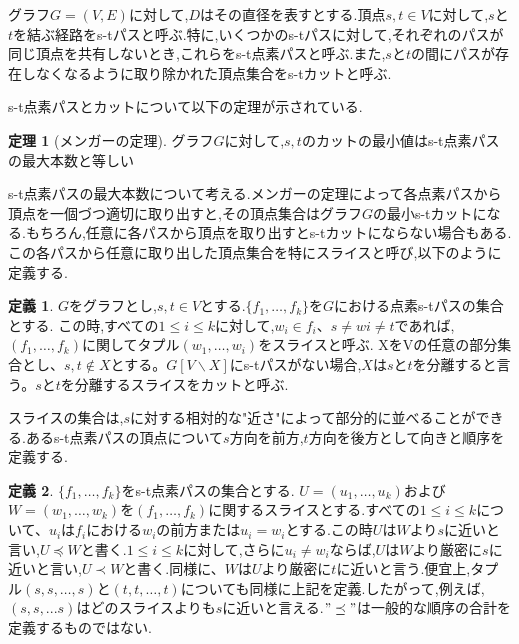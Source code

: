 \documentclass{thesis}
\theoremstyle{definition}
\newtheorem{theorem}{定理}
\newtheorem{definition}{定義}
\begin{document}
グラフ$G=(V,E)$に対して,$D$はその直径を表すとする.頂点$s,t\in V$に対して,$s$と$t$を結ぶ経路をs-tパスと呼ぶ.特に,いくつかのs-tパスに対して,それぞれのパスが同じ頂点を共有しないとき,これらをs-t点素パスと呼ぶ.また,$s$と$t$の間にパスが存在しなくなるように取り除かれた頂点集合をs-tカットと呼ぶ.\par

s-t点素パスとカットについて以下の定理が示されている.

\begin{theorem}[メンガーの定理]
    グラフ$G$に対して,$s,t$のカットの最小値はs-t点素パスの最大本数と等しい
\end{theorem}

s-t点素パスの最大本数について考える.メンガーの定理によって各点素パスから頂点を一個づつ適切に取り出すと,その頂点集合はグラフ$G$の最小s-tカットになる.もちろん,任意に各パスから頂点を取り出すとs-tカットにならない場合もある.この各パスから任意に取り出した頂点集合を特にスライスと呼び,以下のように定義する.

\begin{definition}
    $G$をグラフとし,$s,t\in V$とする.$\{f_1, \dots ,f_k\}$を$G$における点素s-tパスの集合とする.
    この時,すべての$1\leq i\leq k$に対して,$w_i \in f_i$、$s \neq wi \neq t$であれば,$(f_1, \dots ,f_k)$に関してタプル$(w_1, \dots ,w_i)$をスライスと呼ぶ.
    XをVの任意の部分集合とし、$s,t \notin X$とする。$G[V\backslash X]$にs-tパスがない場合,$X$は$s$と$t$を分離すると言う。$s$と$t$を分離するスライスをカットと呼ぶ.
\end{definition}

スライスの集合は,$s$に対する相対的な"近さ"によって部分的に並べることができる.あるs-t点素パスの頂点について$s$方向を前方,$t$方向を後方として向きと順序を定義する.

\begin{definition}
    $\{f_1, \dots ,f_k\}$をs-t点素パスの集合とする.
    $U=(u_1, \dots, u_k)$および$W=(w_1, \dots ,w_k)$を$(f_1, \dots ,f_k)$に関するスライスとする.すべての$1\leq i\leq k$について、$u_i$は$f_i$における$w_i$の前方または$u_i=w_i$とする.この時$U$は$W$より$s$に近いと言い,$U\preceq W$と書く.$1 \leq i \leq k$に対して,さらに$u_i \neq w_i$ならば,$U$は$W$より厳密に$s$に近いと言い,$U \prec W$と書く.同様に、$W$は$U$より厳密に$t$に近いと言う.便宜上,タプル$(s,s, \dots ,s)$と$(t,t, \dots ,t)$についても同様に上記を定義.したがって,例えば,$(s,s,...s)$はどのスライスよりも$s$に近いと言える.$"\preceq"$は一般的な順序の合計を定義するものではない.
\end{definition}
\end{document}
